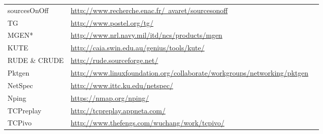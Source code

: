 \begin{table}[ht!]
\begin{tabularx}{\textwidth}{@{}ll@{} p{10.0cm}}
sourcesOnOff            & \href{http://www.recherche.enac.fr/~avaret/sourcesonoff}{http://www.recherche.enac.fr/~avaret/sourcesonoff}                                                                                                               \\
TG                      & \href{http://www.postel.org/tg/}{http://www.postel.org/tg/}                                                                                                                                                               \\
MGEN*                   & \href{http://www.nrl.navy.mil/itd/ncs/products/mgen }{http://www.nrl.navy.mil/itd/ncs/products/mgen }                                                                                                                     \\
KUTE                    & \href{http://caia.swin.edu.au/genius/tools/kute/}{http://caia.swin.edu.au/genius/tools/kute/}                                                                                                                             \\
RUDE \& CRUDE            & \href{http://rude.sourceforge.net/}{ http://rude.sourceforge.net/}                                                                                                                                                        \\
Pktgen                  & \href{http://www.linuxfoundation.org/collaborate/workgroups/networking/pktgen}{http://www.linuxfoundation.org/collaborate/workgroups/networking/pktgen}                                                                   \\
NetSpec                 & \href{http://www.ittc.ku.edu/netspec/}{http://www.ittc.ku.edu/netspec/}                                                                                                                                                   \\
Nping                   & \href{https://nmap.org/nping/ }{https://nmap.org/nping/}                                                                                                                                                                  \\
TCPreplay               & \href{http://tcpreplay.appneta.com/}{http://tcpreplay.appneta.com/}                                                                                                                                                       \\
TCPivo                  & \href{http://www.thefengs.com/wuchang/work/tcpivo/}{http://www.thefengs.com/wuchang/work/tcpivo/}                                                                                                                         \\

\end{tabularx}
\end{table}
